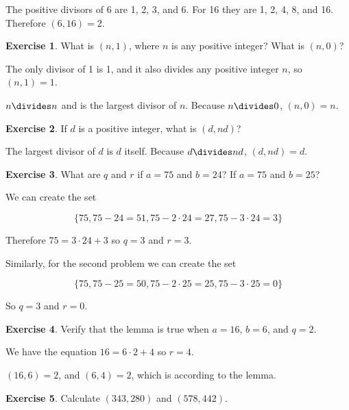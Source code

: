 \documentclass{article}
\theoremstyle{definition}
\newtheorem{exercise}{Exercise}
\begin{document}
  The positive divisors of 6 are 1, 2, 3, and 6. For 16 they are 1, 2, 4, 8, and 16. Therefore $(6, 16) = 2$.
  
  \begin{exercise}
    What is $(n, 1)$, where $n$ is any positive integer? What is $(n, 0)$?
  \end{exercise}
  
  The only divisor of 1 is 1, and it also divides any positive integer $n$, so $(n, 1) = 1$.
  
  $n \divides n$ and is the largest divisor of $n$. Because $n \divides 0$, $(n, 0) = n$.
  
  \begin{exercise}
    If $d$ is a positive integer, what is $(d, nd)$?
  \end{exercise}

  The largest divisor of $d$ is $d$ itself. Because $d \divides nd$, $(d, nd) = d$.
  
  \begin{exercise}
    What are $q$ and $r$ if $a = 75$ and $b = 24$? If $a = 75$ and $b = 25$?
  \end{exercise}
  
  We can create the set
  
  \begin{equation*}
    \{75, 75 - 24 = 51, 75 - 2 \cdot 24 = 27, 75 - 3 \cdot 24 = 3\}
  \end{equation*}
  
  Therefore $75 = 3 \cdot 24 + 3$ so $q = 3$ and $r = 3$.
  
  Similarly, for the second problem we can create the set
  
    \begin{equation*}
      \{75, 75 - 25 = 50, 75 - 2 \cdot 25 = 25, 75 - 3 \cdot 25 = 0\}
    \end{equation*}
  
  So $q = 3$ and $r = 0$.
  
  \begin{exercise}
    Verify that the lemma is true when $a = 16$, $b = 6$, and $q = 2$.
  \end{exercise}
  
  We have the equation $16 = 6 \cdot 2 + 4$ so $r = 4$.
  
  $(16, 6) = 2$, and $(6, 4) = 2$, which is according to the lemma.
  
  \begin{exercise}
    Calculate $(343, 280)$ and $(578, 442)$.
  \end{exercise}
  
\end{document}
